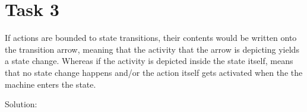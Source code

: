 \chapter{Task 3}
\begin{parlist}
	\item If actions are bounded to state transitions, their contents would be written onto the transition arrow, meaning that the activity that the arrow is depicting yields a state change. Whereas if the activity is depicted inside the state itself, means that no state change happens and/or the action itself gets activated when the the machine enters the state.
	\item Solution:
	\begin{figure}[hbt]
  \caption{}
\end{figure}

\end{parlist}
